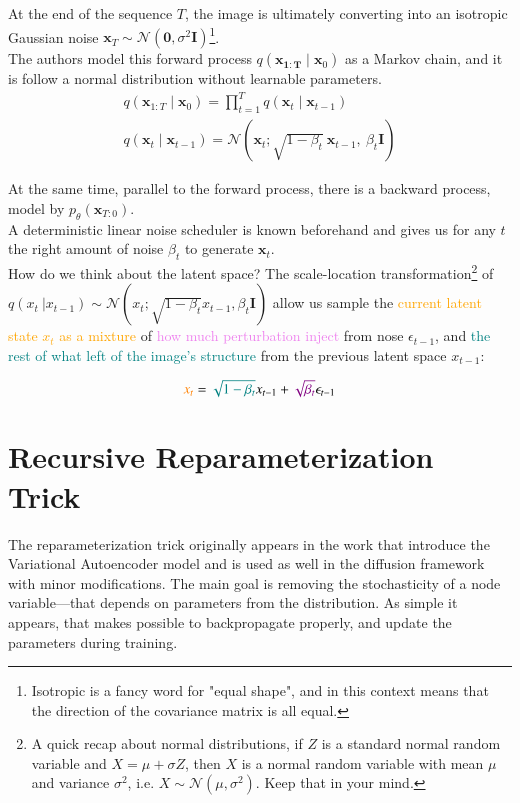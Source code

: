 At the end of the sequence $T$, the image is ultimately converting into an isotropic Gaussian noise $\mathbf{x}_{T}\sim \mathcal{N}(\mathbf{0}, \sigma^2\mathbf{I})$\footnote{Isotropic is a fancy word for "equal shape", and in this context means that the direction of the covariance matrix is all equal.}.\\

The authors model this forward process $q(\mathbf{x_{1:T}}\mid\mathbf{x}_{0})$ as a Markov chain, and it
is follow a normal distribution without learnable 
parameters.
\begin{align}
q(\mathbf{x}_{1:T}\mid\mathbf{x}_0) = \prod_{t=1}^{T}q(\mathbf{x}_t\mid\mathbf{x}_{t-1})
\\
q(\mathbf{x}_t\mid\mathbf{x}_{t-1}) = \mathcal{N}(\mathbf{x}_t;\sqrt{1-\beta_{t}}~\mathbf{x}_{t-1},~ \beta_{t}\mathbf{I})
\end{align}

At the same time, parallel to the forward process, there is
a backward process, model by $p_{\theta}(\mathbf{x}_{T:0})$.\\

A deterministic linear noise scheduler is known beforehand and gives us for any $t$ the right amount of noise $\beta_{t}$ to generate $\mathbf{x}_{t}$. \\

How do we think about the latent space? The scale-location transformation\footnote{A quick recap about normal distributions, if $Z$ is a standard normal random variable and $X=\mu + \sigma Z$, then $X$ is a normal random variable with mean $\mu$ and
variance $\sigma^2$, i.e. $X\sim\mathcal{N}(\mu, \sigma^2)$.
Keep that in your mind.} of $q(x_{t}~|x_{t-1})\sim\mathcal{N}(x_{t}; \sqrt{1-\beta_{t}} x_{t-1}, \beta_{t}\mathbf{I})$ allow us sample the \textcolor{orange}{current latent state $x_{t}$ as a mixture} of \textcolor{violet}{how
much perturbation inject} from nose $\epsilon_{t-1}$, and \textcolor{teal}{the rest of what left of the image's structure} from the previous latent space $x_{t-1}:$

$$
\textcolor{orange}{x_{t}} = \textcolor{teal}{\sqrt{1-\beta_{t}}} x_{t-1} + \textcolor{violet}{\sqrt{\beta_{t}}}\epsilon_{t-1}
$$

\section{Recursive Reparameterization Trick}

The reparameterization trick originally appears in the work that introduce the Variational Autoencoder model \cite{kingma2013auto} and is used as well in the diffusion framework with minor modifications. The main goal is removing the stochasticity of a node variable---that depends on parameters from the distribution. As simple it appears, that makes possible to backpropagate properly, and update the parameters during training. \\

